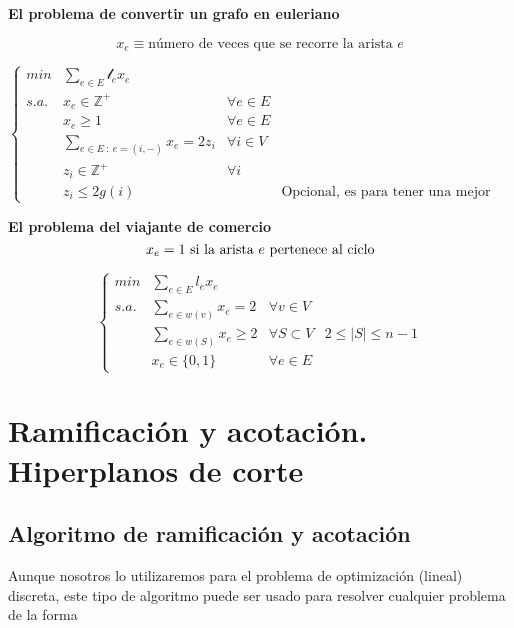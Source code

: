\documentclass[openany]{book}
\begin{document}
\begin{exercise}
    {\color{turquoise} \textbf{El problema de convertir un grafo en euleriano}}

    $$ x_{e} \equiv \text{número de veces que se recorre la arista } e $$

    $$ \left\{
    \begin{array}{llrr}
        min & \sum\limits_{e \in E}^{} \mathcal{l}_{e}x_{e}\\
        s.a. & x_{e} \in \mathbb{Z}^{+} & \forall e \in E\\
        & x_{e} \geq 1   & \forall e \in E\\
        & \sum\limits_{e \in E\ :\ e = (i,-)}^{} x_{e} = 2z_{i} & \forall i \in V\\
        & z_i \in \mathbb{Z}^{+} & \forall i\\
        & z_i \leq 2g(i) & & \text{Opcional, es para tener una mejor formulación}
    \end{array}
    \right. $$
\end{exercise}

\begin{exercise}
    {\color{turquoise} \textbf{El problema del viajante de comercio}}
    $$ x_{e} = 1 \text{ si la arista $ e $ pertenece al ciclo} $$

    $$ \left\{
    \begin{array}{llrr}
        min & \sum\limits_{e \in E}^{} l_{e}x_{e}\\
        s.a. & \sum\limits_{e \in w(v)}^{} x_{e} = 2 & \forall v \in V\\
        & \sum\limits_{e \in w(S)}^{} x_{e} \geq 2 & \forall S \subset V & 2 \leq |S|\leq n-1 \\
        & x_{e} \in \{0,1\} & \forall e \in E
    \end{array}
    \right. $$


\end{exercise}

\chapter{Ramificación y acotación. Hiperplanos de corte}

\section{Algoritmo de ramificación y acotación}

Aunque nosotros lo utilizaremos para el problema de optimización (lineal) discreta, este tipo de algoritmo puede ser usado para resolver cualquier problema de la forma
\end{document}
